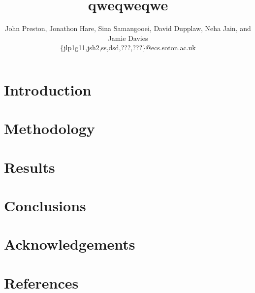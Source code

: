 \documentclass{acm_proc_article-me11_tweaked}
\title{qweqweqwe}
\author{John Preston, Jonathon Hare, Sina Samangooei, David Dupplaw, Neha Jain,
        and Jamie Davies\\
        \{jlp1g11,jsh2,ss,dsd,???,???\}@ecs.soton.ac.uk}
\begin{document}

\maketitle

\begin{abstract}
\end{abstract}

\section{Introduction}


\section{Methodology}


\section{Results}

\section{Conclusions}

\section{Acknowledgements}

\section{References}


\end{document}
